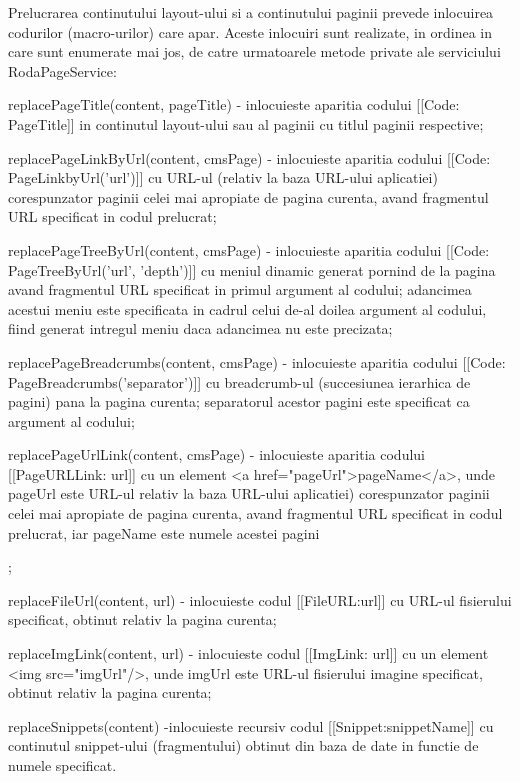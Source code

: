 Prelucrarea continutului layout-ului si a continutului paginii prevede inlocuirea codurilor (macro-urilor) care apar. Aceste inlocuiri sunt realizate, in ordinea in care sunt enumerate mai jos, de catre urmatoarele metode private ale serviciului RodaPageService:
\begin{itemize}
\item{replacePageTitle(content, pageTitle) - inlocuieste aparitia codului [[Code: PageTitle]] in continutul layout-ului sau al paginii cu titlul paginii respective;}
\item{replacePageLinkByUrl(content, cmsPage) - inlocuieste aparitia codului [[Code: PageLinkbyUrl('url')]] cu URL-ul (relativ la baza URL-ului aplicatiei) corespunzator paginii celei mai apropiate de pagina curenta, avand fragmentul URL specificat in codul prelucrat;} 
\item{replacePageTreeByUrl(content, cmsPage) - inlocuieste aparitia codului [[Code: PageTreeByUrl('url', 'depth')]] cu meniul dinamic generat pornind de la pagina avand fragmentul URL specificat in primul argument al codului; adancimea acestui meniu este specificata in cadrul celui de-al doilea argument al codului, fiind generat intregul meniu daca adancimea nu este precizata;
\item{replacePageBreadcrumbs(content, cmsPage) - inlocuieste aparitia codului [[Code: PageBreadcrumbs('separator')]]} cu breadcrumb-ul (succesiunea ierarhica de pagini) pana la pagina curenta; separatorul acestor pagini este specificat ca argument al codului;
\item{replacePageUrlLink(content, cmsPage)}  - inlocuieste aparitia codului [[PageURLLink: url]] cu un element <a href="pageUrl">pageName</a>, unde pageUrl este URL-ul relativ la baza URL-ului aplicatiei) corespunzator paginii celei mai apropiate de pagina curenta, avand fragmentul URL specificat in codul prelucrat, iar pageName este numele acestei pagini};
\item{replaceFileUrl(content, url) - inlocuieste codul [[FileURL:url]] cu URL-ul fisierului specificat, obtinut relativ la pagina curenta;}
\item{replaceImgLink(content, url) - inlocuieste codul [[ImgLink: url]] cu un element <img src="imgUrl"/>, unde imgUrl este URL-ul fisierului imagine specificat, obtinut relativ la pagina curenta;}
\item{replaceSnippets(content) -inlocuieste recursiv codul [[Snippet:snippetName]] cu continutul snippet-ului (fragmentului) obtinut din baza de date in functie de numele specificat.}
\end{itemize}


